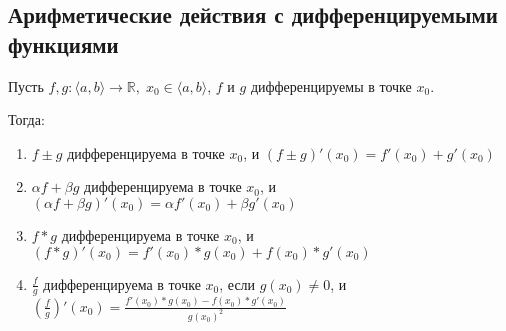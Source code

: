 \subsection{Арифметические действия с дифференцируемыми функциями \href{https://youtu.be/OXDjegAsmSU?t=2141}{\Walley}}
Пусть $f, g: \langle a, b \rangle \to \mathbb{R}, \; x_0 \in \langle a, b \rangle$, $f$ и $g$ дифференцируемы в точке $x_0$.

Тогда:
\begin{enumerate}
    \item $f \pm g$ дифференцируема в точке $x_0$, и $(f \pm g)'(x_0) = f'(x_0) + g'(x_0)$
    \item $\alpha f + \beta g$ дифференцируема в точке $x_0$, и $(\alpha f + \beta g)'(x_0) = \alpha f'(x_0) + \beta g'(x_0)$
    \item $f * g$ дифференцируема в точке $x_0$, и $(f * g)'(x_0) = f'(x_0) * g(x_0) + f(x_0) * g'(x_0)$
    \item $\frac{f}{g}$ дифференцируема в точке $x_0$, если $g(x_0) \neq 0$, и $(\frac{f}{g})'(x_0) = \frac{f'(x_0) * g(x_0) - f(x_0) * g'(x_0)}{g(x_0)^2}$
\end{enumerate}
